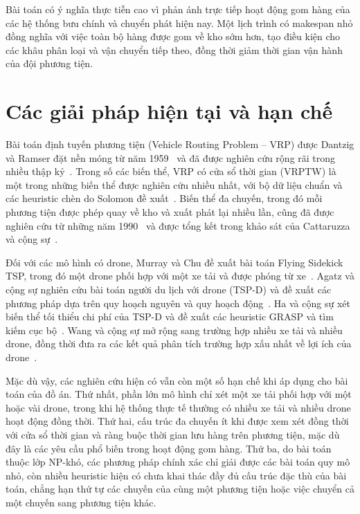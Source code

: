 \documentclass[../DoAn.tex]{subfiles}
\begin{document}
Bài toán có ý nghĩa thực tiễn cao vì phản ánh trực tiếp hoạt động gom hàng của các hệ thống bưu chính và chuyển phát hiện nay. Một lịch trình có makespan nhỏ đồng nghĩa với việc toàn bộ hàng được gom về kho sớm hơn, tạo điều kiện cho các khâu phân loại và vận chuyển tiếp theo, đồng thời giảm thời gian vận hành của đội phương tiện.

\section{Các giải pháp hiện tại và hạn chế}
\label{sec:giaiphap}

Bài toán định tuyến phương tiện (Vehicle Routing Problem -- VRP) được Dantzig và Ramser đặt nền móng từ năm 1959~\cite{dantzig1959truck} và đã được nghiên cứu rộng rãi trong nhiều thập kỷ~\cite{toth2014vehicle}. Trong số các biến thể, VRP có cửa sổ thời gian (VRPTW) là một trong những biến thể được nghiên cứu nhiều nhất, với bộ dữ liệu chuẩn và các heuristic chèn do Solomon đề xuất~\cite{solomon1987algorithms}. Biến thể đa chuyến, trong đó mỗi phương tiện được phép quay về kho và xuất phát lại nhiều lần, cũng đã được nghiên cứu từ những năm 1990~\cite{taillard1996vehicle} và được tổng kết trong khảo sát của Cattaruzza và cộng sự~\cite{cattaruzza2016multitrip}.

Đối với các mô hình có drone, Murray và Chu đề xuất bài toán Flying Sidekick TSP, trong đó một drone phối hợp với một xe tải và được phóng từ xe~\cite{murray2015flying}. Agatz và cộng sự nghiên cứu bài toán người du lịch với drone (TSP-D) và đề xuất các phương pháp dựa trên quy hoạch nguyên và quy hoạch động~\cite{agatz2018optimization}. Ha và cộng sự xét biến thể tối thiểu chi phí của TSP-D và đề xuất các heuristic GRASP và tìm kiếm cục bộ~\cite{ha2018min}. Wang và cộng sự mở rộng sang trường hợp nhiều xe tải và nhiều drone, đồng thời đưa ra các kết quả phân tích trường hợp xấu nhất về lợi ích của drone~\cite{wang2017vehicle}.

Mặc dù vậy, các nghiên cứu hiện có vẫn còn một số hạn chế khi áp dụng cho bài toán của đồ án. Thứ nhất, phần lớn mô hình chỉ xét một xe tải phối hợp với một hoặc vài drone, trong khi hệ thống thực tế thường có nhiều xe tải và nhiều drone hoạt động đồng thời. Thứ hai, cấu trúc đa chuyến ít khi được xem xét đồng thời với cửa sổ thời gian và ràng buộc thời gian lưu hàng trên phương tiện, mặc dù đây là các yêu cầu phổ biến trong hoạt động gom hàng. Thứ ba, do bài toán thuộc lớp NP-khó, các phương pháp chính xác chỉ giải được các bài toán quy mô nhỏ, còn nhiều heuristic hiện có chưa khai thác đầy đủ cấu trúc đặc thù của bài toán, chẳng hạn thứ tự các chuyến của cùng một phương tiện hoặc việc chuyển cả một chuyến sang phương tiện khác.
\end{document}
